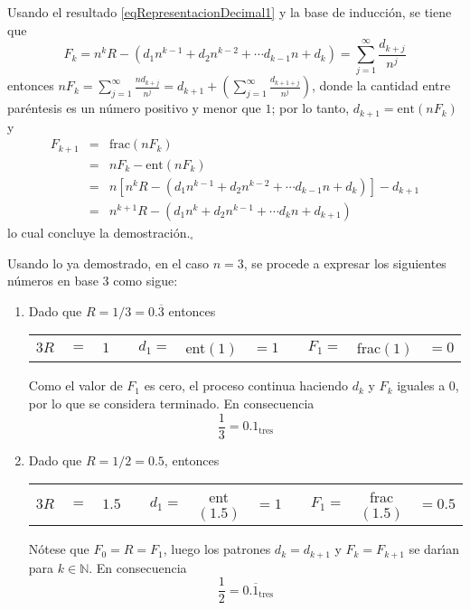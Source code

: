 \begin{solucion}
 \par 
 Usando el resultado \eqref{eqRepresentacionDecimal1} y la base de inducci\'on, se tiene que
 \begin{equation*}
  F_k = n^k R - \left(  d_1n^{k-1} + d_2n^{k-2} + \cdots d_{k-1}n + d_k \right) = \sum_{j=1}^{\infty} \frac{d_{k+j}}{n^j}
 \end{equation*}
 entonces $nF_{k} = \sum_{j=1}^{\infty} \frac{nd_{k+j}}{n^j} = d_{k+1} + \left( \sum_{j=1}^{\infty} \frac{d_{k+1+j}}{n^j} \right)$, donde la cantidad entre par\'entesis es un n\'umero positivo y menor que $1$; por lo tanto, $d_{k+1} = \text{ent}(nF_k)$ y
 \begin{eqnarray*}
  F_{k+1} & = & \text{frac}(nF_k) \\
  & = & nF_k - \text{ent}(nF_k) \\
  & = & n\left[ n^kR - \left( d_1n^{k-1} + d_2n^{k-2} + \cdots d_{k-1}n + d_k \right) \right] - d_{k+1} \\
  & = & n^{k+1}R - \left( d_1n^{k} + d_2n^{k-1} + \cdots d_kn + d_{k+1} \right)
 \end{eqnarray*}
 lo cual concluye la demostraci\'on.${}_{\square}$
 \par 
 Usando lo ya demostrado, en el caso $n=3$, se procede a expresar los siguientes n\'umeros en base $3$ como sigue:
 \begin{enumerate}
  \item Dado que $R = 1/3 = 0.\overline{3}$ entonces 
  \begin{center}
   \begin{tabular}{rclcrclcrcl}
    $3R$ & $=$ & $1$ & \hspace{1.5cm} & $d_1 =$ & ent$(1)$ & $=1$ & \hspace{1.5cm} & $F_1=$ & frac$(1)$ & $=0$ 
   \end{tabular}
  \end{center}
  Como el valor de $F_1$ es cero, el proceso continua haciendo $d_k$ y $F_k$ iguales a $0$, por lo que se considera terminado. En consecuencia
  \begin{equation*}
   \frac{1}{3} = 0.1_\text{tres}
  \end{equation*}

  \item Dado que $R = 1/2 = 0.5$, entonces
  \begin{center}
   \begin{tabular}{rclcrclcrcl}
    $3R$ & $=$ & $1.5$ & \hspace{1.5cm} & $d_1 =$ & ent$(1.5)$ & $=1$ & \hspace{1.5cm} & $F_1=$ & frac$(1.5)$ & $=0.5$
   \end{tabular}
  \end{center}
  N\'otese que $F_0 = R = F_1$, luego los patrones $d_k = d_{k+1}$ y $F_k = F_{k+1}$ se dar\'{\i}an para $k\in\mathbb{N}$. En consecuencia
  \begin{equation*}
   \frac{1}{2} = 0.\overline{1}_{\text{tres}}
  \end{equation*}


\end{enumerate}
\end{solucion}
